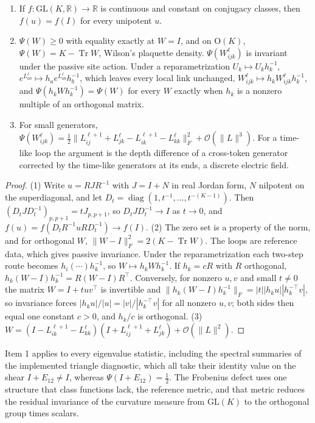 \documentclass[twoside,11pt]{article}
\begin{document}
\begin{proposition}
\label{prop:lie_blind}
\begin{enumerate}
\item If $f:\mathrm{GL}(K,\mathbb R)\to\mathbb R$ is continuous and constant on conjugacy classes, then $f(u)=f(I)$ for every unipotent $u$.
\item $\Psi(W)\ge0$ with equality exactly at $W=I$, and on $\mathrm O(K)$, $\Psi(W)=K-\operatorname{Tr}W$, Wilson's plaquette density. $\Psi(W_{ijk}^\ell)$ is invariant under the passive site action. Under a reparametrization $U_k\mapsto U_kh_k^{-1}$, $e^{L_{ab}^\ell}\mapsto h_ae^{L_{ab}^\ell}h_b^{-1}$, which leaves every local link unchanged, $W_{ijk}^\ell\mapsto h_kW_{ijk}^\ell h_k^{-1}$, and $\Psi(h_kWh_k^{-1})=\Psi(W)$ for every $W$ exactly when $h_k$ is a nonzero multiple of an orthogonal matrix.
\item For small generators, $\Psi(W_{ijk}^\ell)=\tfrac12\|L_{ij}^{\ell+1}+L_{jk}^\ell-L_{ik}^{\ell+1}-L_{kk}^\ell\|_F^2+\mathcal O(\|L\|^3)$. For a time-like loop the argument is the depth difference of a cross-token generator corrected by the time-like generators at its ends, a discrete electric field.
\end{enumerate}
\end{proposition}
\begin{proof}
(1) Write $u=RJR^{-1}$ with $J=I+N$ in real Jordan form, $N$ nilpotent on the superdiagonal, and let $D_t=\operatorname{diag}(1,t^{-1},\ldots,t^{-(K-1)})$. Then $(D_tJD_t^{-1})_{p,p+1}=tJ_{p,p+1}$, so $D_tJD_t^{-1}\to I$ as $t\to0$, and $f(u)=f(D_tR^{-1}uRD_t^{-1})\to f(I)$. (2) The zero set is a property of the norm, and for orthogonal $W$, $\|W-I\|_F^2=2(K-\operatorname{Tr}W)$. The loops are reference data, which gives passive invariance. Under the reparametrization each two-step route becomes $h_i(\cdots)h_k^{-1}$, so $W\mapsto h_kWh_k^{-1}$. If $h_k=cR$ with $R$ orthogonal, $h_k(W-I)h_k^{-1}=R(W-I)R^\top$. Conversely, for nonzero $u,v$ and small $t\ne0$ the matrix $W=I+tuv^\top$ is invertible and $\|h_k(W-I)h_k^{-1}\|_F=|t||h_ku||h_k^{-\top}v|$, so invariance forces $|h_ku|/|u|=|v|/|h_k^{-\top}v|$ for all nonzero $u,v$; both sides then equal one constant $c>0$, and $h_k/c$ is orthogonal. (3) $W=(I-L_{ik}^{\ell+1}-L_{kk}^\ell)(I+L_{ij}^{\ell+1}+L_{jk}^\ell)+\mathcal O(\|L\|^2)$.
\end{proof}

Item 1 applies to every eigenvalue statistic, including the spectral summaries of the implemented triangle diagnostic, which all take their identity value on the shear $I+E_{12}\ne I$, whereas $\Psi(I+E_{12})=\tfrac12$. The Frobenius defect uses one structure that class functions lack, the reference metric, and that metric reduces the residual invariance of the curvature measure from $\mathrm{GL}(K)$ to the orthogonal group times scalars.
\end{document}
